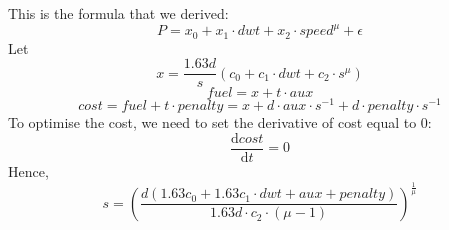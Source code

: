 \documentclass[a4paper,12pt]{article}
\begin{document}
This is the formula that we derived:
\[P=x_0+x_1\cdot dwt+x_2\cdot speed^{\mu}+\epsilon\]
Let \[x=\frac{1.63d}{s}(c_0+c_1\cdot dwt+c_2\cdot s^{\mu})\]
\[fuel=x+t\cdot aux\] 
\[cost=fuel+t\cdot penalty=x+d\cdot aux\cdot s^{-1}+d\cdot penalty\cdot s^{-1}\]
To optimise the cost, we need to set the derivative of cost equal to 0: \[\frac{\mathrm{d}cost}{\mathrm{d}t}=0\]
Hence,
\[s=(\frac{d(1.63c_0+1.63c_1\cdot dwt+aux+penalty)}{1.63d\cdot c_2\cdot (\mu-1)})^{\frac{1}{\mu}}\] 
\end{document}
